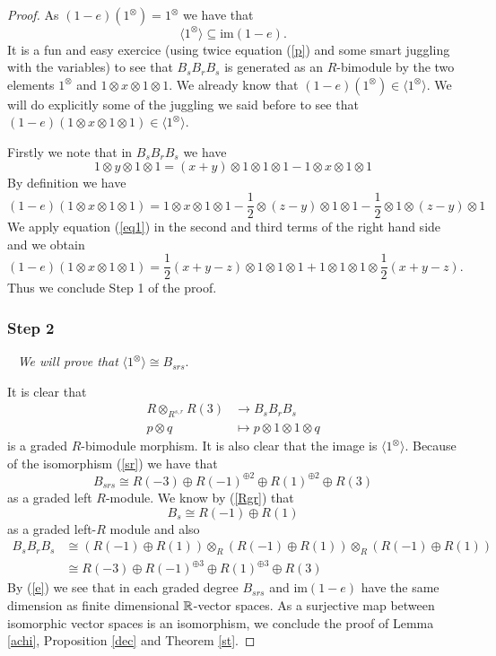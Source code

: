 \documentclass[12pt]{wart}
\theoremstyle{remark}
\begin{document}
\begin{proof}
As $(1-e)(1^{\otimes})=1^{\otimes}$ we have that $$\langle 1^{\otimes} \rangle  \subseteq    \mathrm{im}(1-e).$$
 It is a fun and easy exercice (using twice equation (\ref{p}) and some smart juggling with the variables) to see that  $B_sB_rB_s$ is generated as an $R$-bimodule by the two elements $1^{\otimes}$ and $1\otimes x\otimes 1\otimes 1$. We already know that $(1-e)(1^{\otimes})\in   \langle 1^{\otimes} \rangle$. We will do explicitly some of the juggling we said before to see that $ (1-e)(1\otimes x\otimes 1\otimes 1) \in\langle  1^{\otimes} \rangle$.

Firstly we note that in $B_sB_rB_s$ we have \begin{equation}\label{eq1}1\otimes y\otimes 1\otimes1 =(x+y)\otimes 1\otimes 1\otimes 1-1\otimes x\otimes 1\otimes 1\end{equation}
By definition we have
$$
(1-e)(1\otimes x\otimes 1\otimes 1)= 1\otimes x\otimes 1\otimes 1-\frac{1}{2}\otimes (z-y)\otimes 1\otimes 1 -\frac{1}{2}\otimes 1\otimes (z-y)\otimes 1$$
We apply equation (\ref{eq1}) in the second and third terms of the right hand side  and we obtain 
$$
(1-e)(1\otimes x\otimes 1\otimes 1)= \frac{1}{2} (x+y-z)\otimes 1\otimes 1\otimes 1 +1\otimes 1\otimes 1\otimes \frac{1}{2}(x+y-z).$$
Thus we conclude Step 1 of the proof. 


\subsubsection{Step 2}\ \textit{ We will prove that }$ \langle 1^{\otimes} \rangle \cong B_{srs}$.



 It is clear that 
\begin{align*}
 R\otimes_{R^{s,r}}R(3)  & \rightarrow  B_sB_rB_s\\
p\otimes q & \mapsto p\otimes 1\otimes 1\otimes q
\end{align*}
is a graded $R$-bimodule morphism. It is also clear that the image is $  \langle 1^{\otimes} \rangle$. Because of the isomorphism (\ref{sr}) we have that 
$$B_{srs} \cong  R(-3)\oplus R(-1)^{\oplus 2}\oplus R(1)^{\oplus 2}\oplus R(3)$$
 as a graded left $R$-module. We know by (\ref{Rgr}) that $$B_s\cong R(-1)\oplus R(1)$$ as a graded  left-$R$ module and also 
\begin{align*}
B_sB_rB_s&\cong (R(-1)\oplus R(1))\otimes_R(R(-1)\oplus R(1))\otimes_R (R(-1)\oplus R(1))\\
&\cong R(-3)\oplus R(-1)^{\oplus 3}\oplus R(1)^{\oplus 3}\oplus R(3)
\end{align*}
By  (\ref{e}) we see that in each graded degree $B_{srs}$ and $\mathrm{im}(1-e)$ have the same dimension as finite dimensional $\mathbb R$-vector spaces. As a surjective map between isomorphic vector spaces is an isomorphism, we conclude the proof of Lemma \ref{achi}, Proposition \ref{dec} and Theorem \ref{st}. 
\end{proof}
\end{document}
